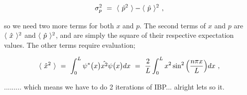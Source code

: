 \documentclass{article}
\begin{document}
\begin{equation} \label{eq:253}
\sigma_{p}^{2} \hspace{0.125cm} = \hspace{0.125cm} \langle \hspace{0.125cm} \hat{p}^{2} \hspace{0.125cm} \rangle - \langle \hspace{0.125cm} \hat{p} \hspace{0.125cm} \rangle^{2} \hspace{0.125cm} ,
\end{equation}

so we need two more terms for both \begin{math} x \end{math} and \begin{math} p \end{math}. The second terms of \begin{math} x \end{math} and \begin{math} p \end{math} are \begin{math} \langle \hspace{0.125cm} \hat{x} \hspace{0.125cm} \rangle^{2} \end{math} and \begin{math} \langle \hspace{0.125cm} \hat{p} \hspace{0.125cm} \rangle^{2} \end{math}, and are simply the square of their respective expectation values. The other terms require evaluation;

\begin{equation} \label{eq:254}
\langle \hspace{0.125cm} \hat{x}^{2} \hspace{0.125cm} \rangle \hspace{0.125cm} = \hspace{0.125cm} \int_{0}^{L} \psi^{\ast}\big(x\big) \hat{x^{2}} \psi\big(x\big) dx \hspace{0.125cm} = \hspace{0.125cm} \frac{2}{L} \int_{0}^{L} x^2 \sin^{2}\Big(\frac{n\pi x}{L}\Big) dx \hspace{0.125cm} , 
\end{equation}

......... which means we have to do 2 iterations of IBP... alright lets so it. 
\end{document}
